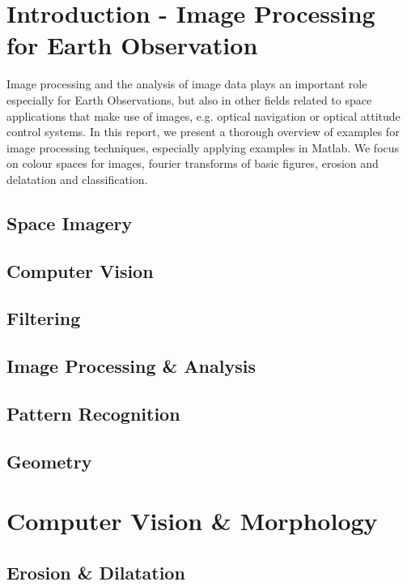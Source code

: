 \section{Introduction - Image Processing for Earth Observation}
Image processing and the analysis of image data plays an important role especially for Earth Observations, but also in other fields related to space applications that make use of images, e.g. optical navigation or optical attitude control systems. In this report, we present a thorough overview of examples for image processing techniques, especially applying examples in Matlab. We focus on colour spaces for images, fourier transforms of basic figures, erosion and delatation and classification. 

\subsection{Space Imagery}

\subsection{Computer Vision}

\subsection{Filtering}

\subsection{Image Processing \& Analysis}

\subsection{Pattern Recognition}

\subsection{Geometry}


\section{Computer Vision \& Morphology}

\subsection{Erosion \& Dilatation}

